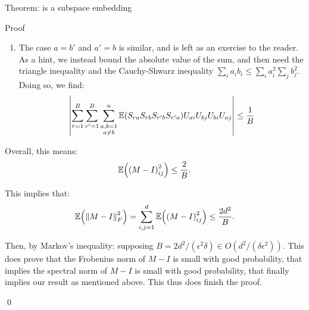 \documentclass[a4paper]{article}
\begin{document}
\begin{parag}{Theorem:  is a subspace embedding}
\begin{subparag}{Proof}
\begin{enumerate}[left=0pt]
            We notice that $\exval\left(S_{r a}^2 S_{r b}^2\right)$ is the probability that both $a, b$ hash to the value $r$. Since $a \neq b$, this is at most $\frac{1}{B^2}$, hence: 
            
        \item The case $a = b'$ and $a' = b$ is similar, and is left as an exercise to the reader. As a hint, we instead bound the absolute value of the sum, and then need the triangle inequality and the Cauchy-Shwarz inequality $\sum_{i} a_i b_i \leq \sum_{i} a_i^2 \sum_{j} b_j^2$. Doing so, we find: 
        \[\left|\sum_{r=1}^{B} \sum_{r' = 1}^{B} \sum_{\substack{a, b = 1 \\ a\neq b}}^{n} \exval\left(S_{r a} S_{r b} S_{r' b} S_{r' a}\right) U_{a i} U_{b j} U_{b i} U_{a j}\right| \leq \frac{1}{B}\]
        \end{enumerate}

        Overall, this means: 
        \[\exval\left(\left(M-I\right)^2_{i j}\right) \leq \frac{2}{B}.\]

        This implies that: 
        \[\exval\left(\left\|M - I\right\|_F^2\right) = \sum_{i, j=1}^{d} \exval\left(\left(M-I\right)^2_{ij}\right) \leq \frac{2d^2}{B}.\]
        
        Then, by Markov's inequality: 
        supposing $B = 2 d^2 / \left(\epsilon^2 \delta\right) \in O\left(d^2 / \left(\delta \epsilon^2\right)\right)$. This does prove that the Frobenius norm of $M - I$ is small with good probability, that implies the spectral norm of $M - I$ is small with good probability, that finally implies our result as mentioned above. This thus does finish the proof.

        \qed
    \end{subparag}
\end{parag}
\end{document}
